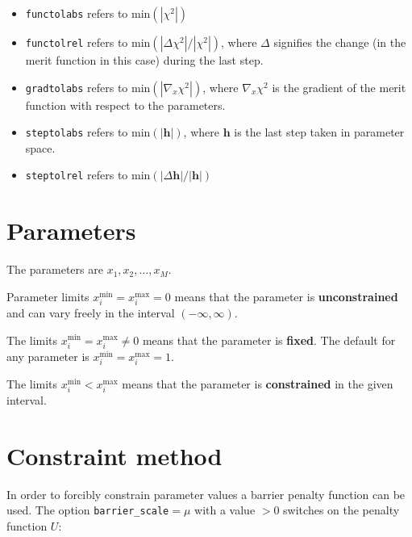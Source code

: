 \documentclass[a4paper,12pt,pdftex,onecolumn]{article}
\begin{document}
\begin{itemize}
\item
\verb+functolabs+ refers to $\mathrm{min}(|\chi^2|)$

\item
\verb+functolrel+ refers to $\mathrm{min}(|\Delta \chi^2|/|\chi^2|)$, where
$\Delta$ signifies the change (in the merit function in this case) during the
last step.

\item
\verb+gradtolabs+ refers to $\mathrm{min}(|\nabla_x \chi^2|)$, where $\nabla_x \chi^2$
is the gradient of the merit function with respect to the parameters.

\item
\verb+steptolabs+ refers to $\mathrm{min}(|\mathbf{h}|)$, where $\mathbf{h}$ is
the last step taken in parameter space.

\item
\verb+steptolrel+ refers to $\mathrm{min}(|\Delta \mathbf{h}|/|\mathbf{h}|)$
\end{itemize}








\section{Parameters}

The parameters are $x_1, x_2, \ldots, x_M$.

Parameter limits $x_i^{\mathrm{min}} = x_i^{\mathrm{max}} = 0$
means that the parameter is
\textbf{unconstrained} and can vary freely in the interval $(-\infty, \infty)$.

The limits $x_i^{\mathrm{min}} = x_i^{\mathrm{max}} \neq 0$
means that the parameter is \textbf{fixed}.
The default for any parameter is $x_i^{\mathrm{min}} = x_i^{\mathrm{max}} = 1$.

The limits $x_i^{\mathrm{min}} < x_i^{\mathrm{max}}$
means that the parameter is \textbf{constrained} in the given interval.



\section{Constraint method}

In order to forcibly constrain parameter values a barrier penalty function can be used.
The option \verb+barrier_scale+$=\mu$ with a value $>0$ switches on the penalty
function $U$:
\end{document}
